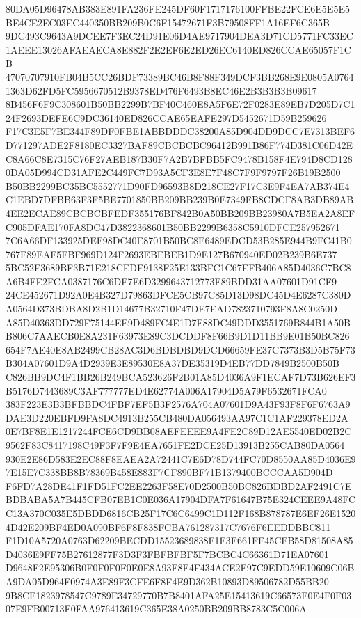 \documentclass[UTF8,fontset=fandol,zihao=-4,a4paper]{ctexart}
\begin{document}
{{80DA05D96478AB383E891FA236FE245DF60F1717176100FFBE22FCE6E5E5E5BE4CE2EC03EC440350BB209B0C6F15472671F3B79508FF1A16EF6C365B
9DC493C9643A9DCEE7F3EC24D91E06D4AE9717904DEA3D71CD5771FC33EC1AEEE13026AFAEAECA8E882F2E2EF6E2ED26EC6140ED826CCAE65057F1CB
47070707910FB04B5CC26BDF73389BC46B8F88F349DCF3BB268E9E0805A07641363D62FD5FC5956670512B9378ED476F6493B8EC46E2B3B3B3B09617
8B456F6F9C308601B50BB2299B7BF40C460E8A5F6E72F0283E89EB7D205D7C124F2693DEFE6C9DC36140ED826CCAE65EAFE297D5452671D59B259626
F17C3E5F7BE344F89DF0FBE1ABBDDDC38200A85D904DD9DCC7E7313BEF6D771297ADE2F8180EC3327BAF89CBCBCBC96412B991B86F774D381C06D42E
C8A66C8E7315C76F27AEB187B30F7A2B7BFBB5FC9478B158F4E794D8CD1280DA05D994CD31AFE2C449FC7D93A5CF3E8E7F48C7F9F9797F26B19B2500
B50BB2299BC35BC5552771D90FD96593B8D218CE27F17C3E9F4EA7AB374E4C1EBD7DFBB63F3F5BE7701850BB209BB239B0E7349FB8CDCF8AB3DB89AB
4EE2ECAE89CBCBCBFEDF355176BF842B0A50BB209BB23980A7B5EA2A8EFC905DFAE170FA8DC47D3822368601B50BB2299B6358C5910DFCE257952671
7C6A66DF133925DEF98DC40E8701B50BC8E6489EDCD53B285E944B9FC41B0767F89EAF5FBF969D124F2693EBEBEB1D9E127B670940ED02B239B6E737
5BC52F3689BF3B71E218CEDF9138F25E133BFC1C67EFB406A85D4036C7BC8A6B4FE2FCA0387176C6DF7E6D3299643712773F89BDD31AA07601D91CF9
24CE452671D92A0E4B327D79863DFCE5CB97C85D13D98DC45D4E6287C380DA0564D373BDBA8D2B1D14677B32710F47DE7EAD7823710793F8A8C0250D
A85D40363DD729F75144EE9D489FC4E1D7F88DC49DDD3551769B844B1A50BB806C7AAECB0E8A231F63973E89C3DCDDF8F66B9D1D11BB9E01B50BC826
654F7AE40E8AB2499CB28AC3D6BDBDBD9DCD66659FE37C7373B3D5B75F73B304A07601D9A4D2939E3E89530E8A37DE35319D4EB77DD7849B2500B50B
C826BB9DC4F1BB26B249BCA523626F2B01A85D4036A9F1ECAF7D73B626EF3B5176D7443689C3AF777777ED4E62774A006A17904D5A79F6532671FCA0
383F223E3B3BFBBDC4FBF7EF5B3F2576A704A07601D9A43F93F8F6F6763A9DAE3D220EBFD9FA8DC4913B255CB480DA056493AA97C1C1AF229378ED2A
0E7BF8E1E1217244FCE6CD9BB08AEFEEEE9A4FE2C89D12AE5540ED02B2C9562F83C8417198C49F3F7F9E4EA7651FE2DCE25D13913B255CAB80DA0564
930E2E86D583E2EC88F8EAEA2A72441C7E6D78D744FC70D8550AA85D4036E97E15E7C338BB8B78369B458E883F7CF890BF71B1379400BCCCAA5D904D
F6FD7A28DE41F1FD51FC2EE2263F58E70D2500B50BC826BDBD2AF2491C7EBDBABA5A7B445CFB07EB1C0E036A17904DFA7F61647B75E324CEEE9A48FC
C13A370C035E5DBDD6816CB25F17C6C6499C1D112F168B878787E6EF26E15204D42E209BF4ED0A090BF6F8F838FCBA761287317C7676F6EEDDBBC811
F1D10A5720A0763D62209BECDD15523689838F1F3F661FF45CFB58D81508A85D4036E9FF75B27612877F3D3F3FBFBFBF5F7BCBC4C66361D71EA07601
D9648F2E95306B0F0F0F0F0E0E8A93F8F4F434ACE2F97C9EDD59E10609C06BA9DA05D964F0974A3E89F3CFE6F8F4E9D362B10893D89506782D55BB20
9B8CE1823978547C9789E34729770B7B8401AFA25E15413619C66573F0E4F0F0307E9FB00713F0FAA976413619C365E38A0250BB209BB8783C5C006A
}}
\end{document}
